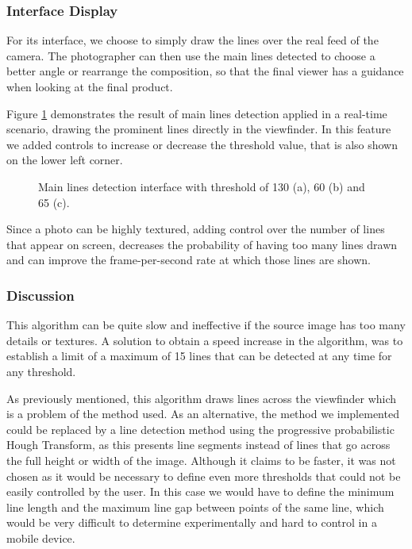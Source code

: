 \subsubsection{Interface Display}

For its interface, we choose to simply draw the lines over the real feed of the camera. The photographer can then use the main lines detected to choose a better angle or rearrange the composition, so that the final viewer has a guidance when looking at the final product.

Figure \ref{fig:mainline_interface} demonstrates the result of main lines detection applied in a real-time scenario, drawing the prominent lines directly in the viewfinder. In this feature we added controls to increase or decrease the threshold value, that is also shown on the lower left corner.

\begin{figure}[htbp]
	\centering
	\begin{minipage}[b]{\textwidth}
  		\centering
  	\end{minipage}
  	\caption{Main lines detection interface with threshold of 130 (a), 60 (b) and 65 (c).}    				\label{fig:mainline_interface}
\end{figure}

Since a photo can be highly textured, adding control over the number of lines that appear on screen, decreases the probability of having too many lines drawn and can improve the frame-per-second rate at which those lines are shown.

\subsubsection{Discussion}

This algorithm can be quite slow and ineffective if the source image has too many details or textures. A solution to obtain a speed increase in the algorithm, was to establish a limit of a maximum of 15 lines that can be detected at any time for any threshold.

As previously mentioned, this algorithm draws lines across the viewfinder which is a problem of the method used. As an alternative, the method we implemented could be replaced by a line detection method using the progressive probabilistic Hough Transform\cite{matas2000robust}, as this presents line segments instead of lines that go across the full height or width of the image. Although it claims to be faster, it was not chosen as it would be necessary to define even more thresholds that could not be easily controlled by the user. In this case we would have to define the minimum line length and the maximum line gap between points of the same line, which would be very difficult to determine experimentally and hard to control in a mobile device.

